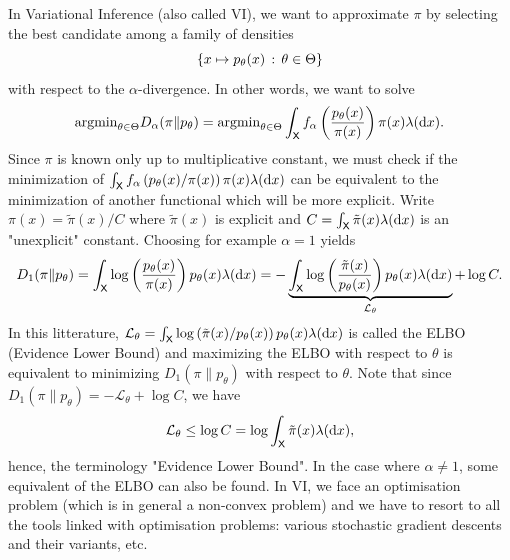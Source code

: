 \documentclass[english,graybox,envcountchap,envcountsame,sectrefs,shortlabels]{svmono}
\theoremstyle{style}
\begin{document}
\newcommand{\argmin}{\mathrm{argmin}}
In Variational Inference (also called VI), we want to approximate $\pi$ by selecting the best candidate among a family of densities
$$
\left\{ x\mapsto p_\theta(x)\,:\,\theta\in\Theta\right\}
$$
with respect to the $\alpha$-divergence. In other words, we want to solve
$$
\argmin_{\theta\in\Theta} D_\alpha(\pi \| p_\theta)= \argmin_{\theta\in\Theta} \int_{\Xset} f_\alpha\lr{\frac{p_\theta(x)}{\pi(x)}} \pi(x) \lambda(\rmd x).
$$
Since $\pi$ is known only up to multiplicative constant, we must check if the minimization of $\int_{\mathsf{X}} f_\alpha\left(p_\theta(x)/\pi(x)\right) \pi(x) \lambda(\mathrm{d} x)$ can be equivalent to the minimization of another functional which will be more explicit. Write $\pi(x)=\tilde \pi(x)/C$ where $\tilde \pi(x)$ is explicit and $C=\int_{\mathsf{X}} \tilde \pi(x)\lambda(\mathrm{d} x)$ is an "unexplicit" constant. Choosing for example $\alpha=1$ yields
$$
D_1(\pi \| p_\theta)= \int_{\mathsf{X}} \log\left(\frac{p_\theta(x)}{\pi(x)}\right) p_\theta(x) \lambda(\mathrm{d} x)=-\underbrace{\int_{\mathsf{X}} \log\left(\frac{\tilde \pi(x)}{p_\theta(x)}\right) p_\theta(x) \lambda(\mathrm{d} x)}_{\mathcal{L}_{\theta}} + \log C.
$$
In this litterature, $\mathcal{L}_{\theta} = \int_{\mathsf{X}} \log\left(\tilde \pi(x)/p_\theta(x)\right) p_\theta(x) \lambda(\mathrm{d} x)$ is called the ELBO (Evidence Lower Bound) and maximizing the ELBO with respect to $\theta$ is equivalent to minimizing $ D_1(\pi \| p_\theta)$ with respect to $\theta$. Note that
since $D_1(\pi \| p_\theta)=-\mathcal{L}_{\theta}+ \log C$, we have
$$
\mathcal{L}_{\theta} \leq \log C=\log \int_{\mathsf{X}} \tilde \pi(x)\lambda(\mathrm{d} x),
$$
hence, the terminology "Evidence Lower Bound". In the case where $\alpha \neq 1$, some equivalent of the ELBO can also be found. In VI, we face  an optimisation problem (which is in general a non-convex problem) and we have to resort to all the tools linked with optimisation problems: various stochastic gradient descents and their variants, etc.
\end{document}
